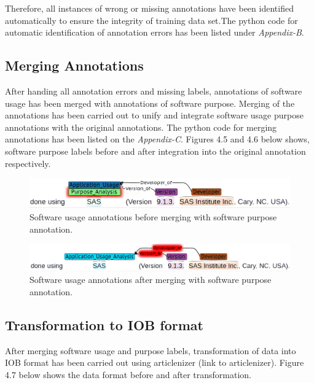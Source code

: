 Therefore, all instances of wrong or missing annotations have been identified automatically to ensure the integrity of training data set.The python code for automatic identification of annotation errors has been listed under \emph{Appendix-B}.

\subsection{Merging Annotations}
\label{subsec:dataset:preprocessing:Merging}

After handing all annotation errors and missing labels, annotations of software usage has been merged with annotations of software purpose. Merging of the annotations has been carried out to unify and integrate software usage purpose annotations with the original annotations. The python code for merging annotations has been listed on the \emph{Appendix-C}. Figures 4.5 and 4.6 below shows, software purpose labels before and after integration into the original annotation respectively.  \\

\begin{figure}[htbp]
	\centering
	\includegraphics[width=.75\textwidth]{4.graphics/figures/ch_4/2002515_plm_unm_HD}
	\caption{Software usage annotations before merging with software purpose  annotation.}
	
	\label{fig:chapter04:setup}
\end{figure}

\begin{figure}[htbp]
	\centering
	\includegraphics[width=.75\textwidth]{4.graphics/figures/ch_4/2002515_plm_HD}
	\caption{Software usage annotations after merging with software purpose  annotation.}
	\label{fig:chapter04:setup}
\end{figure}


\subsection{Transformation to IOB format}
\label{subsec:dataset:preprocessing:Transformation}
After merging software usage and purpose labels, transformation of data into IOB format has been carried out using articlenizer (link to articlenizer). Figure 4.7 below shows the data format before and after transformation. \\

